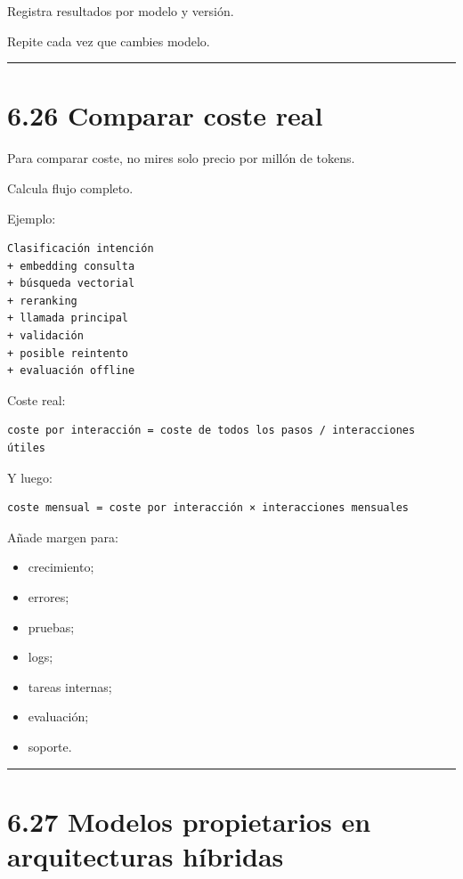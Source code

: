Registra resultados por modelo y versión.

Repite cada vez que cambies modelo.

\begin{center}\rule{0.5\linewidth}{0.5pt}\end{center}

\section{6.26 Comparar coste real}\label{comparar-coste-real}

Para comparar coste, no mires solo precio por millón de tokens.

Calcula flujo completo.

Ejemplo:

\begin{lstlisting}
Clasificación intención
+ embedding consulta
+ búsqueda vectorial
+ reranking
+ llamada principal
+ validación
+ posible reintento
+ evaluación offline
\end{lstlisting}

Coste real:

\begin{lstlisting}
coste por interacción = coste de todos los pasos / interacciones útiles
\end{lstlisting}

Y luego:

\begin{lstlisting}
coste mensual = coste por interacción × interacciones mensuales
\end{lstlisting}

Añade margen para:

\begin{itemize}
\tightlist
\item
  crecimiento;
\item
  errores;
\item
  pruebas;
\item
  logs;
\item
  tareas internas;
\item
  evaluación;
\item
  soporte.
\end{itemize}

\begin{center}\rule{0.5\linewidth}{0.5pt}\end{center}

\section{6.27 Modelos propietarios en arquitecturas
híbridas}\label{modelos-propietarios-en-arquitecturas-huxedbridas}


